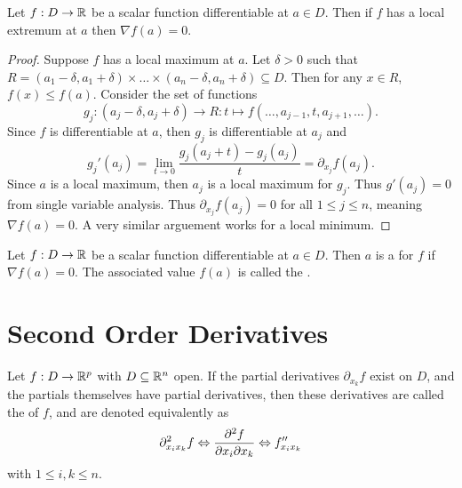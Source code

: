 \documentclass[../main.tex]{subfiles}
\begin{document}
\begin{theorem}
    Let $f : D \to \mathbb{R}$ be a scalar function differentiable at $a \in D$. Then if $f$ has a local extremum at $a$ then $\nabla f(a) = 0$.
\end{theorem}

\begin{proof}
    Suppose $f$ has a local maximum at $a$. Let $\delta > 0$ such that $R = (a_1 - \delta, a_1 + \delta) \times \ldots \times (a_n - \delta, a_n + \delta) \subseteq D$. Then for any $x \in R$, $f(x) \leq f(a)$. Consider the set of functions
    \[
        g_j : (a_j - \delta, a_j + \delta) \to R : t \mapsto f(\ldots, a_{j-1}, t, a_{j+1}, \ldots)
    .\]
    Since $f$ is differentiable at $a$, then $g_j$ is differentiable at $a_j$ and
    \[
        g_j'(a_j) = \lim_{t \to 0} \frac{g_j(a_j + t) - g_j(a_j)}{t} = \partial_{x_j} f(a_j)
    .\]
    Since $a$ is a local maximum, then $a_j$ is a local maximum for $g_j$. Thus $g'(a_j) = 0$ from single variable analysis. Thus $\partial_{x_j} f(a_j) = 0$ for all $1 \leq j \leq n$, meaning $\nabla f(a) = 0$. A very similar arguement works for a local minimum.
\end{proof}

\begin{definition}
    Let $f : D \to \mathbb{R}$ be a scalar function differentiable at $a \in D$. Then $a$ is a  for $f$ if $\nabla f (a) = 0$. The associated value $f(a)$ is called the .
\end{definition}

\section[Second Derivatives]{Second Order Derivatives}

\begin{definition}
    Let $f : D \to \mathbb{R}^p$ with $D \subseteq \mathbb{R}^n$ open. If the partial derivatives $\partial_{x_k} f$ exist on $D$, and the partials themselves have partial derivatives, then these derivatives are called the  of $f$, and are denoted equivalently as
    \[
        \partial_{x_i x_k}^2 f \Leftrightarrow \pdv{f}{x_i}{x_k} \Leftrightarrow f''_{x_i x_k}
    \]
    with $1 \leq i,k \leq n$.
\end{definition}
\end{document}
